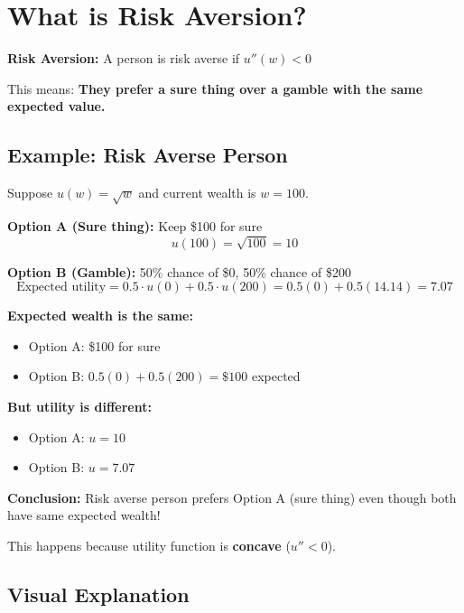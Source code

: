 \documentclass[12pt]{article}
\begin{document}
\newpage

\section*{What is Risk Aversion?}

\begin{center}
\colorbox{yellow!30}{
\begin{minipage}{0.9\textwidth}
\textbf{Risk Aversion:} A person is risk averse if $u''(w) < 0$

This means: \textbf{They prefer a sure thing over a gamble with the same expected value.}
\end{minipage}
}
\end{center}

\subsection*{Example: Risk Averse Person}

Suppose $u(w) = \sqrt{w}$ and current wealth is $w = 100$.

\textbf{Option A (Sure thing):} Keep \$100 for sure
$$u(100) = \sqrt{100} = 10$$

\textbf{Option B (Gamble):} 50\% chance of \$0, 50\% chance of \$200
$$\text{Expected utility} = 0.5 \cdot u(0) + 0.5 \cdot u(200) = 0.5(0) + 0.5(14.14) = 7.07$$

\textbf{Expected wealth is the same:}
\begin{itemize}
    \item Option A: \$100 for sure
    \item Option B: $0.5(0) + 0.5(200) = \$100$ expected
\end{itemize}

\textbf{But utility is different:}
\begin{itemize}
    \item Option A: $u = 10$
    \item Option B: $u = 7.07$
\end{itemize}

\textbf{Conclusion:} Risk averse person prefers Option A (sure thing) even though both have same expected wealth!

This happens because utility function is \textbf{concave} ($u'' < 0$).

\subsection*{Visual Explanation}
\end{document}
